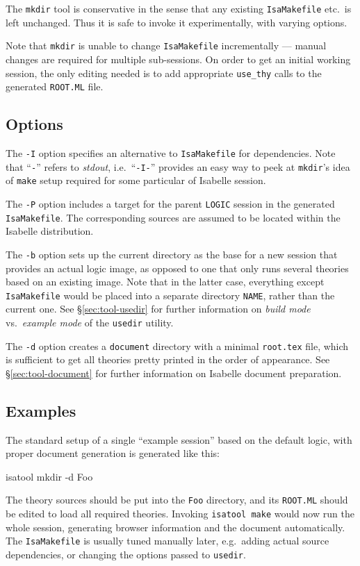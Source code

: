 The \texttt{mkdir} tool is conservative in the sense that any existing
\texttt{IsaMakefile} etc.\ is left unchanged.  Thus it is safe to invoke it
experimentally, with varying options.

Note that \texttt{mkdir} is unable to change \texttt{IsaMakefile}
incrementally --- manual changes are required for multiple sub-sessions.  On
order to get an initial working session, the only editing needed is to add
appropriate \texttt{use_thy} calls to the generated \texttt{ROOT.ML} file.


\subsection*{Options}

The \texttt{-I} option specifies an alternative to \texttt{IsaMakefile} for
dependencies.  Note that ``\texttt{-}'' refers to \emph{stdout}, i.e.\ 
``\texttt{-I-}'' provides an easy way to peek at \texttt{mkdir}'s idea of
\texttt{make} setup required for some particular of Isabelle session.

\medskip The \texttt{-P} option includes a target for the parent
\texttt{LOGIC} session in the generated \texttt{IsaMakefile}.  The
corresponding sources are assumed to be located within the Isabelle
distribution.

\medskip The \texttt{-b} option sets up the current directory as the base for
a new session that provides an actual logic image, as opposed to one that only
runs several theories based on an existing image.  Note that in the latter
case, everything except \texttt{IsaMakefile} would be placed into a separate
directory \texttt{NAME}, rather than the current one.  See
\S\ref{sec:tool-usedir} for further information on \emph{build mode} vs.\ 
\emph{example mode} of the \texttt{usedir} utility.

\medskip The \texttt{-d} option creates a \texttt{document} directory with a
minimal \texttt{root.tex} file, which is sufficient to get all theories pretty
printed in the order of appearance.  See \S\ref{sec:tool-document} for further
information on Isabelle document preparation.


\subsection*{Examples}

The standard setup of a single ``example session'' based on the default logic,
with proper document generation is generated like this:
\begin{ttbox}
isatool mkdir -d Foo
\end{ttbox}
\noindent The theory sources should be put into the \texttt{Foo} directory, and its
\texttt{ROOT.ML} should be edited to load all required theories.  Invoking
\texttt{isatool make} would now run the whole session, generating browser
information and the document automatically.  The \texttt{IsaMakefile} is
usually tuned manually later, e.g.\ adding actual source dependencies, or
changing the options passed to \texttt{usedir}.


